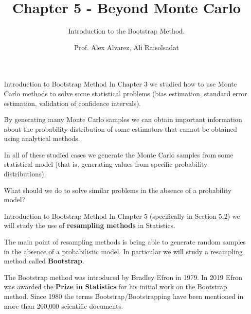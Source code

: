 \documentclass[8pt]{beamer}
\title{Chapter 5 - Beyond Monte Carlo}
\subtitle{Introduction to the Bootstrap Method.}
\author{Prof. Alex Alvarez, Ali Raisolsadat}
\institute{School of Mathematical and Computational Sciences \\ University of Prince Edward Island}
\date{} %
\begin{document}
\maketitle

\begin{frame}{Introduction to Bootstrap Method}
In Chapter 3 we studied how to use Monte Carlo methods to solve some statistical problems (bias estimation, standard error estimation, validation of confidence intervals).

\vspace{3mm}

By generating many Monte Carlo samples we can obtain important information about the probability distribution of some estimators that cannot be obtained using analytical methods.

\vspace{3mm}
 
In all of these studied cases we generate the Monte Carlo samples from some statistical model (that is, generating values from specific probability distributions).
 \vspace{3mm}
 
What should we do to solve similar problems in the absence of a  probability model?
\end{frame}

\begin{frame}{Introduction to Bootstrap Method}
In Chapter 5 (specifically in Section 5.2) we will study the use of \textbf{resampling methods} in Statistics.

\vspace{3mm}

The main point of resampling methods is being able to generate random samples in the absence of a probabilistic model. In particular we will study a resampling method called \textbf{Bootstrap}.

\vspace{3mm}
 
The Bootstrap method was introduced by Bradley Efron in 1979. In 2019 Efron was awarded the \textbf{Prize in Statistics} for his initial work on the Bootstrap method.
Since 1980 the terms Bootstrap/Bootstrapping have been mentioned in more than 200,000 scientific documents.
\end{frame}
\end{document}
